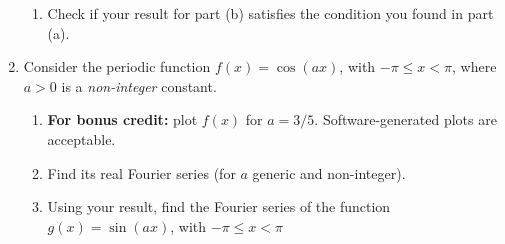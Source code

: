 \documentclass[fleqn]{article}
\begin{document}
\begin{enumerate}
\begin{enumerate}
    \item Check if your result for part (b) satisfies the condition you found in part (a).  
  
  
  \end{enumerate}
  
  \item Consider the periodic function $f(x)=\cos(ax)$, with $-\pi \leq x < \pi$, where $a>0$ is a \emph{non-integer} constant. 
  \begin{enumerate}
  
  \item {\bf For bonus credit:}  plot $f(x)$ for $a=3/5$. Software-generated plots are acceptable. 
  
  \item Find its real Fourier series (for $a$ generic and non-integer).
  
  \item Using your result, find the Fourier series of the function  $g(x)=\sin(ax)$, with $-\pi \leq x < \pi$
  \end{enumerate}
  
  \end{enumerate}

\pagebreak
\end{document}
